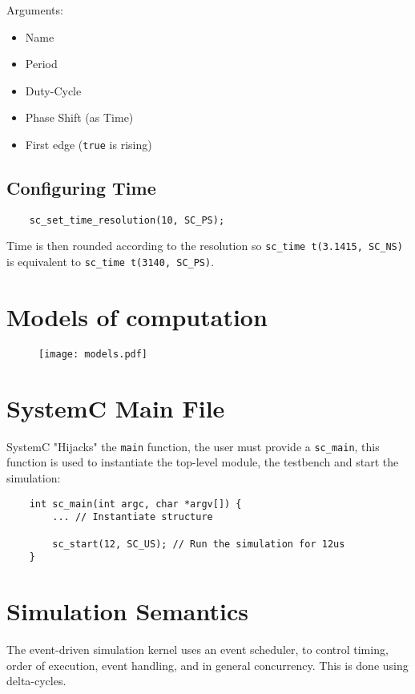 Arguments:
\begin{itemize}
    \item Name
    \item Period
    \item Duty-Cycle
    \item Phase Shift (as Time)
    \item First edge (\lstinline{true} is rising)
\end{itemize}

\subsection{Configuring Time}
\begin{lstlisting}
    sc_set_time_resolution(10, SC_PS);
\end{lstlisting}

Time is then rounded according to the resolution so
\lstinline{sc_time t(3.1415, SC_NS)} is equivalent to
\lstinline{sc_time t(3140, SC_PS)}.

\section{Models of computation}
\begin{figure}[H]
    \centering
    \texttt{[image: models.pdf]}
\end{figure}

\section{SystemC Main File}
SystemC "Hijacks" the \lstinline{main} function, the user must provide a \lstinline{sc_main}, this function is used to instantiate the top-level module, the testbench and start the simulation:
\begin{lstlisting}
    int sc_main(int argc, char *argv[]) {
        ... // Instantiate structure

        sc_start(12, SC_US); // Run the simulation for 12us
    }
\end{lstlisting}

\section{Simulation Semantics}
The event-driven simulation kernel uses an event scheduler, to control timing, order of execution, event handling, and in general concurrency. This is done using delta-cycles.

